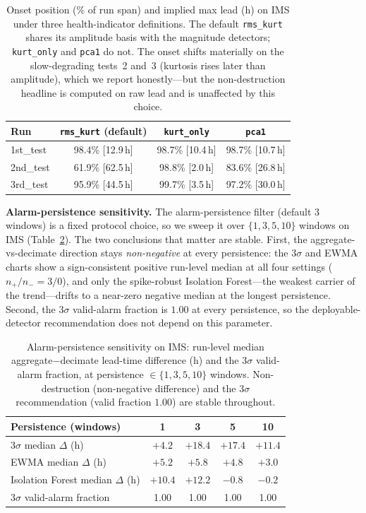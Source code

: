 \documentclass[journal]{IEEEtran}
\begin{document}
\begin{table}[t]
\caption{Onset position (\% of run span) and implied max lead (h) on IMS under three
health-indicator definitions. The default \texttt{rms\_kurt} shares its amplitude basis
with the magnitude detectors; \texttt{kurt\_only} and \texttt{pca1} do not. The onset
shifts materially on the slow-degrading tests~2 and~3 (kurtosis rises later than
amplitude), which we report honestly---but the non-destruction headline is computed on
raw lead and is unaffected by this choice.}
\label{tab:onsetdef}
\centering
\footnotesize
\setlength{\tabcolsep}{5pt}
\begin{tabular}{@{}lccc@{}}
\toprule
Run & \texttt{rms\_kurt} (default) & \texttt{kurt\_only} & \texttt{pca1} \\
\midrule
1st\_test & 98.4\% [12.9\,h] & 98.7\% [10.4\,h] & 98.7\% [10.7\,h] \\
2nd\_test & 61.9\% [62.5\,h] & 98.8\% [\phantom{0}2.0\,h] & 83.6\% [26.8\,h] \\
3rd\_test & 95.9\% [44.5\,h] & 99.7\% [\phantom{0}3.5\,h] & 97.2\% [30.0\,h] \\
\bottomrule
\end{tabular}
\end{table}

\textbf{Alarm-persistence sensitivity.} The alarm-persistence filter (default 3
windows) is a fixed protocol choice, so we sweep it over
$\{1,3,5,10\}$ windows on IMS (Table~\ref{tab:persist}). The two conclusions that
matter are stable. First, the aggregate-vs-decimate direction stays
\emph{non-negative} at every persistence: the 3$\sigma$ and EWMA charts show a
sign-consistent positive run-level median at all four settings ($n_{+}/n_{-}{=}3/0$),
and only the spike-robust Isolation Forest---the weakest carrier of the trend---drifts
to a near-zero negative median at the longest persistence. Second, the 3$\sigma$
valid-alarm fraction is $1.00$ at every persistence, so the deployable-detector
recommendation does not depend on this parameter.

\begin{table}[t]
\caption{Alarm-persistence sensitivity on IMS: run-level median aggregate$-$decimate
lead-time difference (h) and the 3$\sigma$ valid-alarm fraction, at persistence
$\in\{1,3,5,10\}$ windows. Non-destruction (non-negative difference) and the 3$\sigma$
recommendation (valid fraction $1.00$) are stable throughout.}
\label{tab:persist}
\centering
\footnotesize
\setlength{\tabcolsep}{5pt}
\begin{tabular}{@{}lcccc@{}}
\toprule
Persistence (windows) & 1 & 3 & 5 & 10 \\
\midrule
3$\sigma$ median $\Delta$ (h)   & $+4.2$ & $+18.4$ & $+17.4$ & $+11.4$ \\
EWMA median $\Delta$ (h)        & $+5.2$ & $+5.8$  & $+4.8$  & $+3.0$ \\
Isolation Forest median $\Delta$ (h) & $+10.4$ & $+12.2$ & $-0.8$ & $-0.2$ \\
\midrule
3$\sigma$ valid-alarm fraction  & 1.00 & 1.00 & 1.00 & 1.00 \\
\bottomrule
\end{tabular}
\end{table}
\end{document}

